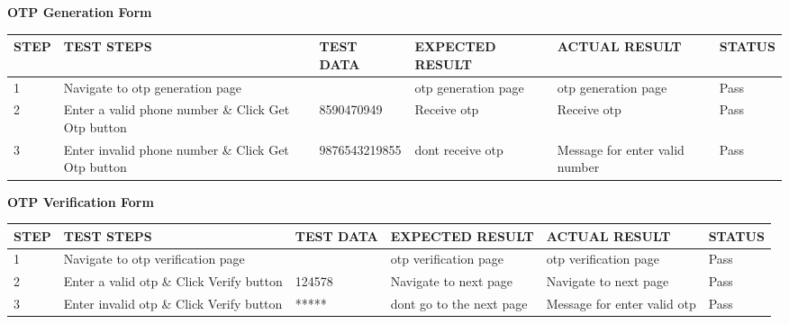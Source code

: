 \vspace{1cm}
\centering \textbf{OTP Generation Form} 
\vspace{0.5cm}
\begin{center}
 
\renewcommand{\arraystretch}{2}

\begin{tabular}{|p{1cm}|p{3cm}|p{3cm}|p{3cm}|p{3cm}|p{2cm}|}

\hline \textbf{STEP} & \textbf{TEST STEPS} & \textbf{TEST DATA} &\textbf{EXPECTED RESULT} & \textbf{ACTUAL RESULT} & \textbf{STATUS}  \\
\hline
1&  Navigate to otp generation page & & otp generation page & otp generation page & Pass\\
\hline
2& Enter a valid phone number \& Click Get Otp button &8590470949 &Receive otp &Receive otp &Pass\\
\hline
3&Enter invalid phone number \& Click Get Otp button & 9876543219855 & dont receive otp & Message for enter valid number & Pass\\
\hline

\end{tabular}
\end{center}

\newpage

\vspace{1cm}
\centering \textbf{OTP Verification Form} 
\vspace{0.5cm}
\begin{center}
 
\renewcommand{\arraystretch}{2}

\begin{tabular}{|p{1cm}|p{3cm}|p{3cm}|p{3cm}|p{3cm}|p{2cm}|}

\hline \textbf{STEP} & \textbf{TEST STEPS} & \textbf{TEST DATA} &\textbf{EXPECTED RESULT} & \textbf{ACTUAL RESULT} & \textbf{STATUS}  \\
\hline
1&  Navigate to otp verification page & & otp verification page & otp verification page & Pass\\
\hline
2& Enter a valid otp \& Click Verify button &124578 & Navigate to next page & Navigate to next page &Pass\\
\hline
3&Enter invalid otp \& Click Verify button & ***** & dont go to the next page & Message for enter valid otp & Pass\\
\hline

\end{tabular}
\end{center}
\newpage
\vspace{5cm}

